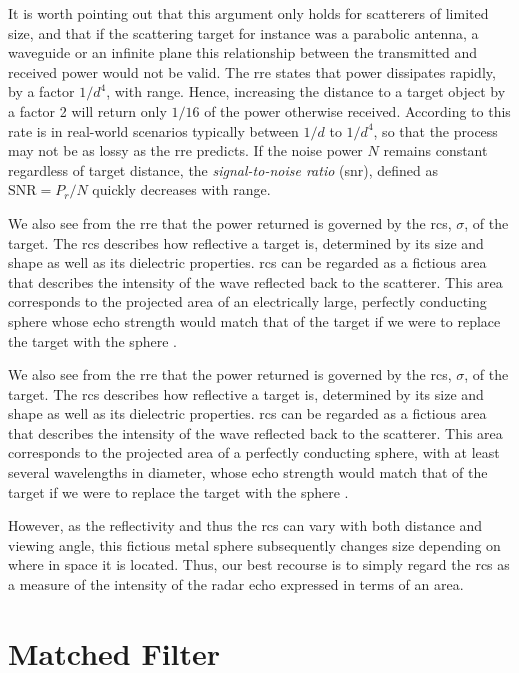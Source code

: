 It is worth pointing out that this argument only holds for scatterers of limited size, and that if the scattering target for instance was a parabolic antenna, a waveguide or an infinite plane this relationship between the transmitted and received power would not be valid. The \gls{rre} states that power dissipates rapidly, by a factor $1/d^4$, with range. Hence, increasing the distance to a target object by a factor 2 will return only $1/16$ of the power otherwise received. According to \citep{richards_2014} this rate is in real-world scenarios typically between $1/d$ to $1/d^4$, so that the process may not be as lossy as the \gls{rre} predicts. If the noise power $N$ remains constant regardless of target distance, the \emph{signal-to-noise ratio} (\gls{snr}), defined as $\text{SNR} = P_r/N$ quickly decreases with range. 

We also see from the \gls{rre} that the power returned is governed by the \gls{rcs}, $\sigma$, of the target. The \gls{rcs} describes how reflective a target is, determined by its size and shape as well as its dielectric properties. \gls{rcs} can be regarded as a fictious area that describes the intensity of the wave reflected back to the scatterer. This area corresponds to the projected area of an electrically large, perfectly conducting sphere whose echo strength would match that of the target if we were to replace the target with the sphere \citep{knott_1993}. 

We also see from the \gls{rre} that the power returned is governed by the \gls{rcs}, $\sigma$, of the target. The \gls{rcs} describes how reflective a target is, determined by its size and shape as well as its dielectric properties. \gls{rcs} can be regarded as a fictious area that describes the intensity of the wave reflected back to the scatterer. This area corresponds to the projected area of a perfectly conducting sphere, with at least several wavelengths in diameter, whose echo strength would match that of the target if we were to replace the target with the sphere \citep{knott_1993}. 

However, as the reflectivity and thus the \gls{rcs} can vary with both distance and viewing angle, this fictious metal sphere subsequently changes size depending on where in space it is located. Thus, our best recourse is to simply regard the \gls{rcs} as a measure of the intensity of the radar echo expressed in terms of an area. 

\section{Matched Filter}\label{sec:mf}


